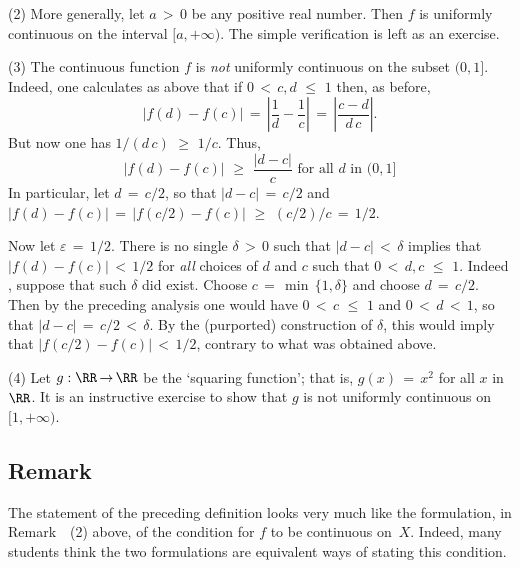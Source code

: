 \V

        (2) More generally, let $a\,>\,0$ be any positive real number. Then $f$ is uniformly continuous on the interval $[a,+{\infty})$.
    The simple verification is left as an exercise.

\V

        (3) The continuous function $f$ is {\em not} uniformly continuous on the subset $(0,1]$.
    Indeed, one calculates as above that if $0\,<\,c,d\,\,{\leq}\,\,1$ then, as before,
        \begin{displaymath}
        |f(d) - f(c)| \,=\, \left|\frac{1}{d} - \frac{1}{c}\right| \,=\, \left|\frac{c-d}{d\,c}\right|.
        \end{displaymath}
    But now one has $1/(d\,c)\,\,{\geq}\,\,1/c$. Thus,
        \begin{displaymath}
        |f(d)-f(c)|\,\,{\geq}\,\,\frac{|d-c|}{c} \mbox{ for all $d$ in $(0,1]$}
        \end{displaymath}
    In particular, let $d \,=\, c/2$, so that $|d-c| \,=\, c/2$ and $|f(d)-f(c)| \,=\, |f(c/2)-f(c)| \,\,{\geq}\,\,(c/2)/c \,=\, 1/2$.

        Now let ${\varepsilon} \,=\, 1/2$. There is no single ${\delta}\,>\,0$ such that $|d-c|\,<\,{\delta}$
    implies that $|f(d)-f(c)|\,<\,1/2$ for {\em all} choices of $d$ and $c$ such that $0\,<\,d,c\,\,{\leq}\,\,1$.
    Indeed , suppose that such ${\delta}$ did exist. Choose $c \,=\, \min\,\{1, {\delta}\}$ and choose $d \,=\, c/2$.
    Then by the preceding analysis one would have $0\,<\,c\,\,{\leq}\,\,1$ and $0\,<\,d\,<\,1$, so that $|d-c| \,=\, c/2\,<\,{\delta}$.
    By the (purported) construction of ${\delta}$, this would imply that $|f(c/2)-f(c)|\,<\,1/2$, contrary to what was obtained above.

\V

        (4) Let $g:{\RR} \,{\rightarrow}\, {\RR}$ be the `squaring function'; that is, $g(x) \,=\, x^{2}$ for all $x$ in~${\RR}$.
    It is an instructive exercise to show that $g$ is not uniformly continuous on~$[1,+{\infty})$.

\VV


            \subsection{\small{\bf Remark}}
            \label{RemrkD25.20}

\V

        The statement of the preceding definition looks very much like the formulation, in Remark~~(2) above,
    of the condition for $f$ to be continuous on~$X$. Indeed, many students think the two formulations are equivalent ways of stating this condition.

